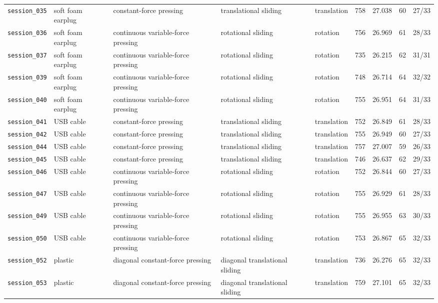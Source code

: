 \documentclass[UTF8,a4paper,11pt]{ctexart}
\begin{document}
\begin{longtable}{lp{1.55cm}p{2.7cm}p{2.65cm}lrrrr}
\texttt{session\_035} & soft foam earplug & constant-force pressing & translational sliding & translation & 758 & 27.038 & 60 & 27/33 \\
\texttt{session\_036} & soft foam earplug & continuous variable-force pressing & rotational sliding & rotation & 756 & 26.969 & 61 & 28/33 \\
\texttt{session\_037} & soft foam earplug & continuous variable-force pressing & rotational sliding & rotation & 735 & 26.215 & 62 & 31/31 \\
\texttt{session\_039} & soft foam earplug & continuous variable-force pressing & rotational sliding & rotation & 748 & 26.714 & 64 & 32/32 \\
\texttt{session\_040} & soft foam earplug & continuous variable-force pressing & rotational sliding & rotation & 755 & 26.951 & 64 & 31/33 \\
\texttt{session\_041} & USB cable & constant-force pressing & translational sliding & translation & 752 & 26.849 & 61 & 28/33 \\
\texttt{session\_042} & USB cable & constant-force pressing & translational sliding & translation & 755 & 26.949 & 60 & 27/33 \\
\texttt{session\_044} & USB cable & constant-force pressing & translational sliding & translation & 757 & 27.007 & 59 & 26/33 \\
\texttt{session\_045} & USB cable & constant-force pressing & translational sliding & translation & 746 & 26.637 & 62 & 29/33 \\
\texttt{session\_046} & USB cable & continuous variable-force pressing & rotational sliding & rotation & 752 & 26.844 & 60 & 27/33 \\
\texttt{session\_047} & USB cable & continuous variable-force pressing & rotational sliding & rotation & 755 & 26.929 & 61 & 28/33 \\
\texttt{session\_049} & USB cable & continuous variable-force pressing & rotational sliding & rotation & 755 & 26.955 & 63 & 30/33 \\
\texttt{session\_050} & USB cable & continuous variable-force pressing & rotational sliding & rotation & 753 & 26.867 & 65 & 32/33 \\
\texttt{session\_052} & plastic & diagonal constant-force pressing & diagonal translational sliding & translation & 736 & 26.276 & 65 & 32/33 \\
\texttt{session\_053} & plastic & diagonal constant-force pressing & diagonal translational sliding & translation & 759 & 27.101 & 65 & 32/33 \\

\end{longtable}
\end{document}
